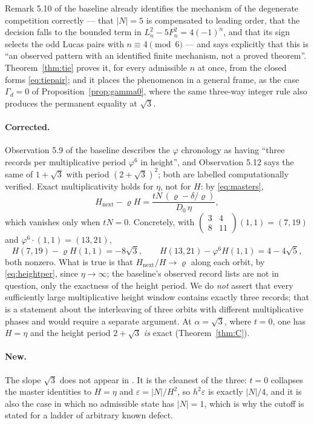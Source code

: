 \documentclass[11pt]{article}
\theoremstyle{definition}
\theoremstyle{remark}
\newcommand{\pr}{\varrho}
\newcommand{\gam}{\Gamma}
\newcommand{\mat}[4]{\left(\begin{smallmatrix}#1&#2\\#3&#4\end{smallmatrix}\right)}
\begin{document}
Remark 5.10 of the baseline already identifies the mechanism of the degenerate competition
correctly --- that $|N|=5$ is compensated to leading order, that the decision falls to the
bounded term in $L_n^2-5F_n^2=4(-1)^n$, and that its sign selects the odd Lucas pairs with
$n\equiv4\pmod6$ --- and says explicitly that this is ``an observed pattern with an identified
finite mechanism, not a proved theorem''. Theorem~\ref{thm:tie} proves it, for every admissible
$n$ at once, from the closed forms \eqref{eq:tiepair}; and it places the phenomenon in a general
frame, as the case $\gam_d=0$ of Proposition~\ref{prop:gamma0}, where the same three-way integer
rule also produces the permanent equality at $\sqrt3$.

\paragraph{Corrected.}
Observation 5.9 of the baseline describes the $\varphi$ chronology as having ``three records
per multiplicative period $\varphi^6$ in height'', and Observation 5.12 says the same of
$1+\sqrt3$ with period $(2+\sqrt3)^2$; both are labelled computationally verified. Exact
multiplicativity holds for $\eta$, not for $H$: by \eqref{eq:masters},
\begin{equation}\label{eq:heightper}
H_{\mathrm{next}}-\pr H=\frac{tN\,(\pr-\delta/\pr)}{D_0\,\eta},
\end{equation}
which vanishes only when $tN=0$. Concretely, with $\mat{3}{4}{8}{11}(1,1)=(7,19)$ and
$\varphi^6\cdot(1,1)=(13,21)$,
\[
H(7,19)-\pr H(1,1)=-8\sqrt3,\qquad
H(13,21)-\varphi^6H(1,1)=4-4\sqrt5,
\]
both nonzero. What is true is that $H_{\mathrm{next}}/H\to\pr$ along each orbit, by
\eqref{eq:heightper}, since $\eta\to\infty$; the baseline's observed record lists are not in
question, only the exactness of the height period. We do \emph{not} assert that every sufficiently large multiplicative height
window contains exactly three records; that is a statement about the interleaving of three
orbits with different multiplicative phases and would require a separate argument. At
$\alpha=\sqrt3$, where $t=0$, one has $H=\eta$ and the height period $2+\sqrt3$ \emph{is} exact
(Theorem~\ref{thm:C}).

\paragraph{New.}
The slope $\sqrt3$ does not appear in \cite{DeJesus2026}. It is the cleanest of the three: $t=0$
collapses the master identities to $H=\eta$ and $\varepsilon=|N|/H^2$, so $h^2\varepsilon$ is
exactly $|N|/4$, and it is also the case in which no admissible state has $|N|=1$, which is why
the cutoff is stated for a ladder of arbitrary known defect.
\end{document}
